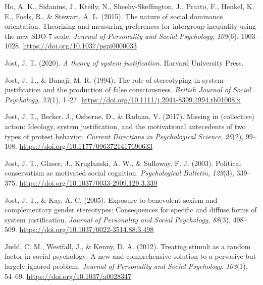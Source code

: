 \documentclass[twocolumn, 11pt, letterpaper]{article}
\newenvironment{CSLReferences}[2]{}{}
\begin{document}
\begin{CSLReferences}{1}{0}
\leavevmode{}%
Ho, A. K., Sidanius, J., Kteily, N., Sheehy-Skeffington, J., Pratto, F.,
Henkel, K. E., Foels, R., \& Stewart, A. L. (2015). The nature of social
dominance orientation: {Theorizing} and measuring preferences for
intergroup inequality using the new {SDO}-7 scale. \emph{Journal of
Personality and Social Psychology}, \emph{109}(6), 1003--1028.
\url{https://doi.org/10.1037/pspi0000033}

\leavevmode{}%
Jost, J. T. (2020). \emph{A theory of system justification}. Harvard
University Press.

\leavevmode{}%
Jost, J. T., \& Banaji, M. R. (1994). The role of stereotyping in
system-justification and the production of false consciousness.
\emph{British Journal of Social Psychology}, \emph{33}(1), 1--27.
\url{https://doi.org/10.1111/j.2044-8309.1994.tb01008.x}

\leavevmode{}%
Jost, J. T., Becker, J., Osborne, D., \& Badaan, V. (2017). Missing in
(collective) action: Ideology, system justification, and the
motivational antecedents of two types of protest behavior. \emph{Current
Directions in Psychological Science}, \emph{26}(2), 99--108.
\url{https://doi.org/10.1177/0963721417690633}

\leavevmode{}%
Jost, J. T., Glaser, J., Kruglanski, A. W., \& Sulloway, F. J. (2003).
Political conservatism as motivated social cognition.
\emph{Psychological Bulletin}, \emph{129}(3), 339--375.
\url{https://doi.org/10.1037/0033-2909.129.3.339}

\leavevmode{}%
Jost, J. T., \& Kay, A. C. (2005). Exposure to benevolent sexism and
complementary gender stereotypes: Consequences for specific and diffuse
forms of system justification. \emph{Journal of Personality and Social
Psychology}, \emph{88}(3), 498--509.
\url{https://doi.org/10.1037/0022-3514.88.3.498}

\leavevmode{}%
Judd, C. M., Westfall, J., \& Kenny, D. A. (2012). Treating stimuli as a
random factor in social psychology: {A} new and comprehensive solution
to a pervasive but largely ignored problem. \emph{Journal of Personality
and Social Psychology}, \emph{103}(1), 54--69.
\url{https://doi.org/10.1037/a0028347}


\end{CSLReferences}
\end{document}
